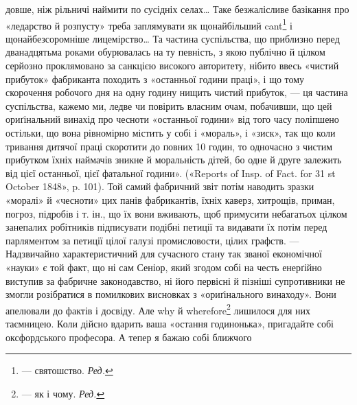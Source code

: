 {довше, ніж рільничі наймити по сусідніх селах\dots{} Таке безжалісливе базікання
про «ледарство й розпусту» треба заплямувати як щонайбільший cant\footnote*{
— святошство. \emph{Ред.}
} і щонайбезсоромніше
лицемірство\dots{} Та частина суспільства, що приблизно перед дванадцятьма роками обурювалась на ту
певність, з якою публічно й цілком серйозно проклямовано за санкцією високого авторитету, нібито
ввесь «чистий прибуток» фабриканта походить з «останньої години праці», і що тому скорочення
робочого дня на одну
годину нищить чистий прибуток, — ця частина суспільства, кажемо ми,
ледве чи повірить власним очам, побачивши, що цей ориґінальний винахід
про чесноти «останньої години» від того часу поліпшено остільки, що вона
рівномірно містить у собі і «мораль», і «зиск», так що коли тривання дитячої праці скоротити до
повних 10 годин, то одночасно з чистим прибутком їхніх наймачів зникне й моральність дітей, бо одне
й друге залежить від цієї останньої, цієї фатальної години». («Reports of Insp. of Fact. for 31 st
October 1848», p. 101). Той самий фабричний звіт потім наводить
зразки «моралі» й «чесноти» цих панів фабрикантів, їхніх каверз, хитрощів,
приман, погроз, підробів і т. ін., що їх вони вживають, щоб примусити небагатьох цілком занепалих
робітників підписувати подібні петиції та видавати їх потім перед парляментом за петиції цілої
галузі промисловости, цілих графств. — Надзвичайно характеристичний для сучасного стану так званої
економічної «науки» є той факт, що ні сам Сеніор, який згодом собі на честь енерґійно виступив за
фабричне законодавство, ні його первісні
й пізніші супротивники не змогли розібратися в помилкових висновках з «ориґінального винаходу». Вони
апелювали до фактів і досвіду. Але why й wherefore\footnote*{
— як і чому. \emph{Ред.}
} лишилося для них таємницею.}
Коли дійсно вдарить ваша «остання годинонька», пригадайте собі оксфордського професора. А тепер я
бажаю собі ближчого
\parbreak{}  %
